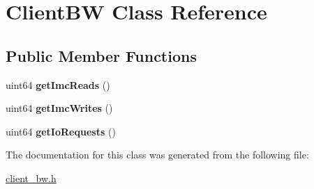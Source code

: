 \hypertarget{class_client_b_w}{}\section{Client\+BW Class Reference}
\label{class_client_b_w}
\subsection*{Public Member Functions}
\begin{DoxyCompactItemize}
\item 
\mbox{\label{class_client_b_w_adfd4220c06e62c3c3afe94d8388bcfe7}} 
uint64 {\bfseries get\+Imc\+Reads} ()
\item 
\mbox{\label{class_client_b_w_ad6ff206335be757c9de8fb732e66d2da}} 
uint64 {\bfseries get\+Imc\+Writes} ()
\item 
\mbox{\label{class_client_b_w_acf0f1555e987641be5196312b89eb12b}} 
uint64 {\bfseries get\+Io\+Requests} ()
\end{DoxyCompactItemize}


The documentation for this class was generated from the following file\+:\begin{DoxyCompactItemize}
\item 
\mbox{\hyperlink{client__bw_8h}{client\+\_\+bw.\+h}}\end{DoxyCompactItemize}
